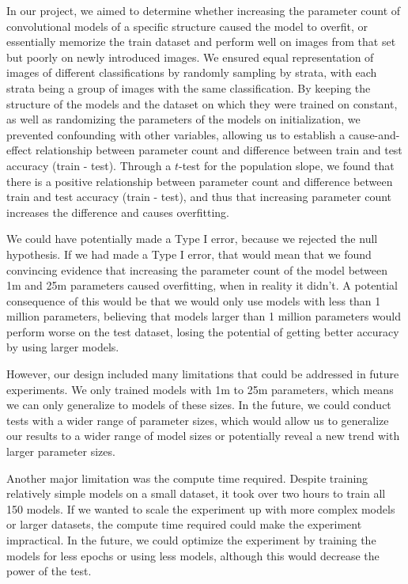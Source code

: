 \documentclass[12pt]{article}
\begin{document}
    In our project, we aimed to determine whether increasing the parameter count of convolutional models of a specific structure caused the model to overfit,
    or essentially memorize the train dataset and perform well on images from that set but poorly on newly introduced images. We ensured equal representation
    of images of different classifications by randomly sampling by strata, with each strata being a group of images with the same classification.
    By keeping the structure of the models and the dataset on which they were trained on constant, as well as randomizing the parameters of the models
    on initialization, we prevented confounding with other variables, allowing us to establish a cause-and-effect relationship between parameter count
    and difference between train and test accuracy (train - test). Through a $t$-test for the population slope, we found that there is a positive relationship
    between parameter count and difference between train and test accuracy (train - test), and thus that increasing parameter count increases the difference and causes overfitting.

    \bigskip\noindent We could have potentially made a Type I error, because we rejected the null hypothesis. If we had made a Type I error,
    that would mean that we found convincing evidence that increasing the parameter count of the model between 1m and 25m parameters
    caused overfitting, when in reality it didn't. A potential consequence of this would be that we would only use models with less than 1 million parameters,
    believing that models larger than 1 million parameters would perform worse on the test dataset, losing the potential
    of getting better accuracy by using larger models.

    \bigskip\noindent However, our design included many limitations that could be addressed in future experiments.
    We only trained models with 1m to 25m parameters, which means we can only generalize to models of these sizes.
    In the future, we could conduct tests with a wider range of parameter sizes, which would allow us to generalize our results to a wider range of model sizes or potentially reveal a new trend with larger parameter sizes.

    \bigskip\noindent Another major limitation was the compute time required. Despite training relatively simple models on a small dataset, it took over two hours to train all 150 models.
    If we wanted to scale the experiment up with more complex models or larger datasets, the compute time required could make the experiment impractical.
    In the future, we could optimize the experiment by training the models for less epochs or using less models, although this would decrease the power of the test.
\end{document}
